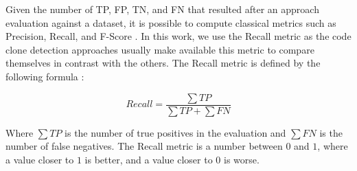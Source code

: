 Given the number of TP, FP, TN, and FN that resulted after an approach evaluation against a dataset,
it is possible to compute classical metrics such as Precision, Recall, and F-Score \citep{recall}.
In this work, we use the Recall metric as the code clone detection approaches usually make available 
this metric to compare themselves in contrast with the others. The Recall metric is defined by the 
following formula \citep{recall}:

$$Recall = \frac{\sum TP}{\sum TP + \sum FN }$$

Where $\sum TP$ is the number of true positives in the evaluation and $\sum FN$ is the number of 
false negatives. The Recall metric is a number between $0$ and $1$, where a value closer to $1$ is 
better, and a value closer to $0$ is worse.









